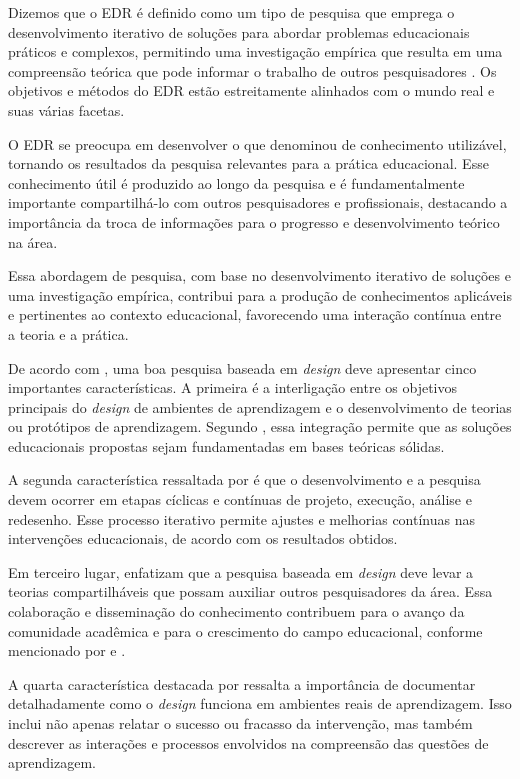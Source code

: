 Dizemos que o EDR é definido como um tipo de pesquisa que emprega o desenvolvimento iterativo de soluções para abordar problemas educacionais práticos e complexos, permitindo uma investigação empírica que resulta em uma compreensão teórica que pode informar o trabalho de outros pesquisadores \cite[p.326]{McKenney2018}. Os objetivos e métodos do EDR estão estreitamente alinhados com o mundo real e suas várias facetas.

O EDR se preocupa em desenvolver o que  denominou de conhecimento utilizável, tornando os resultados da pesquisa relevantes para a prática educacional. Esse conhecimento útil é produzido ao longo da pesquisa e é fundamentalmente importante compartilhá-lo com outros pesquisadores e profissionais, destacando a importância da troca de informações para o progresso e desenvolvimento teórico na área.

Essa abordagem de pesquisa, com base no desenvolvimento iterativo de soluções e uma investigação empírica, contribui para a produção de conhecimentos aplicáveis e pertinentes ao contexto educacional, favorecendo uma interação contínua entre a teoria e a prática.

De acordo com , uma boa pesquisa baseada em \textit{design} deve apresentar cinco importantes características. A primeira é a interligação entre os objetivos principais do \textit{design} de ambientes de aprendizagem e o desenvolvimento de teorias ou protótipos de aprendizagem. Segundo , essa integração permite que as soluções educacionais propostas sejam fundamentadas em bases teóricas sólidas.

A segunda característica ressaltada por  é que o desenvolvimento e a pesquisa devem ocorrer em etapas cíclicas e contínuas de projeto, execução, análise e redesenho. Esse processo iterativo permite ajustes e melhorias contínuas nas intervenções educacionais, de acordo com os resultados obtidos.

Em terceiro lugar,  enfatizam que a pesquisa baseada em \textit{design} deve levar a teorias compartilháveis que possam auxiliar outros pesquisadores da área. Essa colaboração e disseminação do conhecimento contribuem para o avanço da comunidade acadêmica e para o crescimento do campo educacional, conforme mencionado por  e .

A quarta característica destacada por  ressalta a importância de documentar detalhadamente como o \textit{design} funciona em ambientes reais de aprendizagem. Isso inclui não apenas relatar o sucesso ou fracasso da intervenção, mas também descrever as interações e processos envolvidos na compreensão das questões de aprendizagem.

